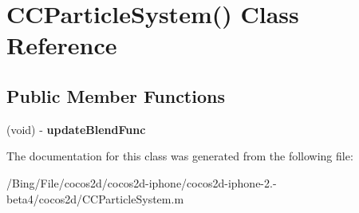 \hypertarget{interface_c_c_particle_system_07_08}{\section{C\-C\-Particle\-System() Class Reference}
\label{interface_c_c_particle_system_07_08}
}
\subsection*{Public Member Functions}
\begin{DoxyCompactItemize}
\item 
\hypertarget{interface_c_c_particle_system_07_08_a343b6e46e6f6750d77631a1356f4a469}{(void) -\/ {\bfseries update\-Blend\-Func}}\label{interface_c_c_particle_system_07_08_a343b6e46e6f6750d77631a1356f4a469}

\end{DoxyCompactItemize}


The documentation for this class was generated from the following file\-:\begin{DoxyCompactItemize}
\item 
/\-Bing/\-File/cocos2d/cocos2d-\/iphone/cocos2d-\/iphone-\/2.-\/beta4/cocos2d/C\-C\-Particle\-System.\-m\end{DoxyCompactItemize}
